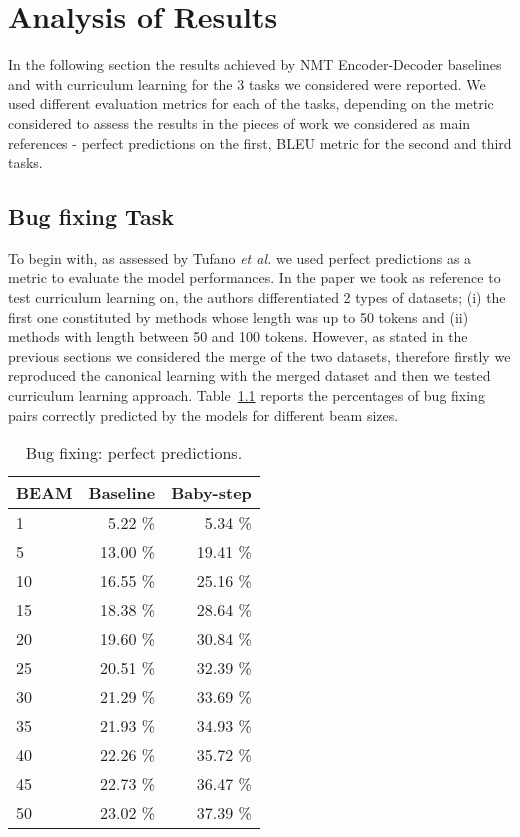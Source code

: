 \chapter{Analysis of Results}
In the following section the results 
achieved by NMT Encoder-Decoder baselines and with curriculum learning for the 3 tasks we considered were reported.
We used different evaluation metrics for each of the tasks, depending on the metric considered to 
assess the results in the pieces of work we considered as main references - perfect predictions on the first, 
BLEU metric for the second and third tasks. 

\section{Bug fixing Task}
To begin with, as assessed by Tufano \textit{et al.} \cite{Tufano2019} we used 
perfect predictions as a metric to evaluate the model performances. In the paper we took as reference
to test curriculum learning on, the authors differentiated 2 types of datasets; (i) the first one constituted by methods
whose length was up to 50 tokens and (ii) methods with length between 50 and 100 tokens. 
However, as stated in the previous sections
we considered the merge of the two datasets, 
therefore firstly we reproduced the canonical learning with the merged dataset and then we tested curriculum learning
approach.
Table~\ref{table:pp_bugfixing} reports the percentages %
of bug fixing pairs correctly predicted
by the models for different beam sizes.
\begin{table}[h!]
    \centering
    \begin{tabular}{l|r|r}
    BEAM & Baseline & Baby-step\\ [0.5ex]
    \hline 
    1 & 5.22 \% & 5.34 \%\\ 
    5 & 13.00 \% & 19.41 \%\\
    10 & 16.55 \% & 25.16 \%\\
    15 & 18.38 \% & 28.64 \%\\
    20 & 19.60 \% & 30.84 \%\\
    25 & 20.51 \% & 32.39 \%\\
    30 & 21.29 \% & 33.69 \%\\
    35 & 21.93 \% & 34.93 \%\\
    40 & 22.26 \% & 35.72 \%\\
    45 & 22.73 \% & 36.47 \%\\
    50 & 23.02 \% & 37.39 \%\\ [1ex]
    \end{tabular}
    \caption{Bug fixing: perfect predictions.}
    \label{table:pp_bugfixing}
\end{table}
